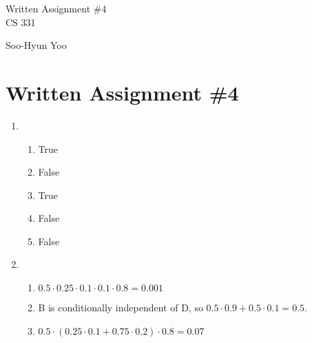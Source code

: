 \documentclass[10pt,letterpaper]{article}
\begin{document}
\begin{titlepage}
	\vspace*{4cm}
	\begin{flushright}
	{\huge
		Written Assignment \#4 \\ [3cm]
	}
	{\large
		CS 331
	}
	\end{flushright}

	\begin{flushright}
	Soo-Hyun Yoo
	\end{flushright}
\end{titlepage}

\section*{Written Assignment \#4}

\begin{enumerate}
	\item
		\begin{enumerate}
			\item True
			\item False
			\item True
			\item False
			\item False
		\end{enumerate}
	\item
		\begin{enumerate}
			\item $0.5 \cdot 0.25 \cdot 0.1 \cdot 0.1 \cdot 0.8 = \boxed{0.001}$
			\item B is conditionally independent of D, so $0.5\cdot0.9 + 0.5\cdot0.1 = \boxed{0.5}$.
			\item $0.5 \cdot \left(0.25\cdot0.1 + 0.75\cdot0.2\right) \cdot 0.8 = \boxed{0.07}$
		\end{enumerate}
\end{enumerate}
\end{document}
